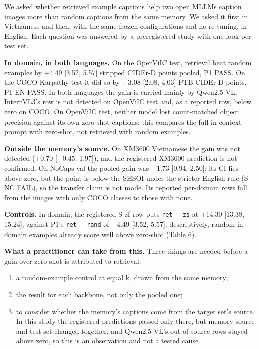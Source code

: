 \documentclass[manuscript,screen]{acmart}
\providecommand{\tightlist}{\setlength{\itemsep}{0pt}\setlength{\parskip}{0pt}}
\begin{document}
We asked whether retrieved example captions help two open MLLMs caption images more than random
captions from the same memory. We asked it first in Vietnamese and then, with the same frozen
configurations and no re-tuning, in English. Each question was answered by a preregistered study
with one look per test set.

\textbf{In domain, in both languages.} On the OpenViIC test, retrieval beat random examples by +4.49
{[}3.52, 5.57{]} stripped CIDEr-D points pooled, P1 PASS. On the COCO Karpathy test it did so by
+3.08 {[}2.08, 4.03{]} PTB CIDEr-D points, P1-EN PASS. In both languages the gain is carried mainly
by Qwen2.5-VL; InternVL3's row is not detected on OpenViIC test and, as a reported row, below zero
on COCO. On OpenViIC test, neither model lost count-matched object precision against its own
zero-shot captions; this compares the full in-context prompt with zero-shot, not retrieved with
random examples.

\textbf{Outside the memory's source.} On XM3600 Vietnamese the gain was not detected (+0.70
{[}−0.45, 1.97{]}), and the registered XM3600 prediction is not confirmed. On NoCaps val the pooled
gain was +1.73 {[}0.94, 2.50{]}: its CI lies above zero, but the point is below the SESOI under the
stricter English rule (S-NC FAIL), so the transfer claim is not made. Its reported per-domain rows
fall from the images with only COCO classes to those with none.

\textbf{Controls.} In domain, the registered S-zf row puts \texttt{ret} − \texttt{zs} at +14.30
{[}13.38, 15.24{]}, against P1's \texttt{ret} − \texttt{rand} of +4.49 {[}3.52, 5.57{]};
descriptively, random in-domain examples already score well above zero-shot (Table 6).

\textbf{What a practitioner can take from this.} Three things are needed before a gain over
zero-shot is attributed to retrieval:

\begin{enumerate}
\def\labelenumi{\arabic{enumi}.}
\tightlist
\item
  a random-example control at equal k, drawn from the same memory;
\item
  the result for each backbone, not only the pooled one;
\item
  to consider whether the memory's captions come from the target set's source. In this study the
  registered predictions passed only there, but memory source and test set changed together, and
  Qwen2.5-VL's out-of-source rows stayed above zero, so this is an observation and not a tested
  cause.
\end{enumerate}
\end{document}
